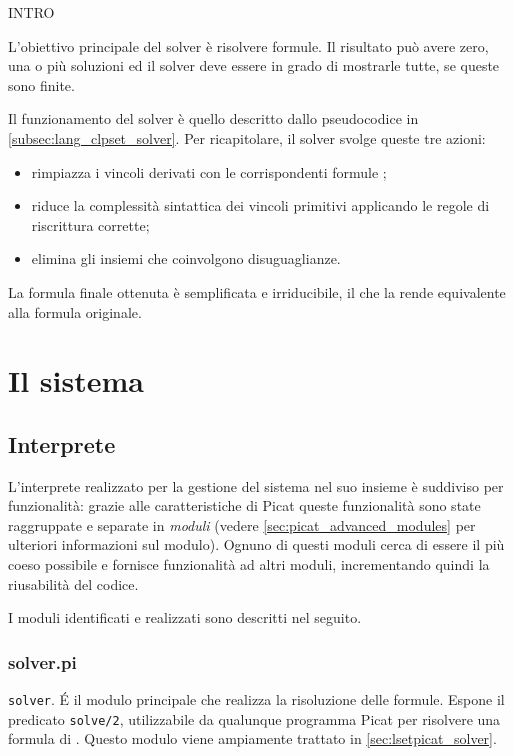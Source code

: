 \documentclass[12pt,a4paper,openright]{book} %
\begin{document}
\minitoc

INTRO

L'obiettivo principale del solver \lset{} è risolvere formule. Il risultato può avere zero, una o più soluzioni ed il solver deve essere in grado di mostrarle tutte, se queste sono finite.

Il funzionamento del solver è quello descritto dallo pseudocodice in  \ref{subsec:lang_clpset_solver}. Per ricapitolare, il solver svolge queste tre azioni:
\begin{itemize}
\item rimpiazza i vincoli derivati con le corrispondenti formule \lset{};
\item riduce la complessità sintattica dei vincoli primitivi applicando le regole di riscrittura corrette;
\item elimina gli insiemi che coinvolgono disuguaglianze.
\end{itemize} 
La formula finale ottenuta è semplificata e irriducibile, il che la rende equivalente alla formula originale.

\section{Il sistema}
\label{ch:clpsetpicat_system}

\subsection{Interprete}
\label{ch:clpsetpicat_system_interpreter}

L'interprete realizzato per la gestione del sistema nel suo insieme è suddiviso per funzionalità: grazie alle caratteristiche di Picat queste funzionalità sono state raggruppate e separate in \emph{moduli} (vedere \ref{sec:picat_advanced_modules} per ulteriori informazioni sul modulo). Ognuno di questi moduli cerca di essere il più coeso possibile e fornisce funzionalità ad altri moduli, incrementando quindi la riusabilità del codice.

I moduli identificati e realizzati sono descritti nel seguito.

\subsubsection{solver.pi}

\verb|solver|. \'E il modulo principale che realizza la risoluzione delle formule. Espone il predicato \verb|solve/2|, utilizzabile da qualunque programma Picat per risolvere una formula di \lset{}. Questo modulo viene ampiamente trattato in \ref{sec:lsetpicat_solver}.
\end{document}
